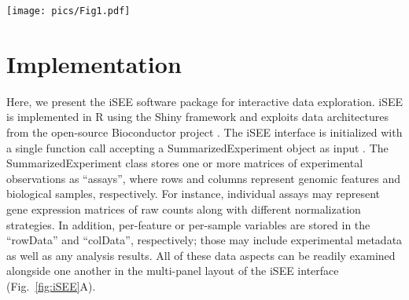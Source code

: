 \documentclass[10pt,a4paper,twocolumn]{article}
\begin{document}
\begin{figure*}[t]
\texttt{[image: pics/Fig1.pdf]}
\caption{iSEE uses a customisable multi-panel layout (A) that simultaneously displays one or more panels of various types, where each panel type visualizes a different aspect of the data.
New panels of any type can be added (i), and all panels can be removed, reordered or resized (ii).
Panel types are available to visualize sample-based reduced dimensionality embeddings (iii), sample-level metadata (iv), and experimental observations across samples for each feature (v).
For these panel types, each sample is represented as a point, which can be coloured according to sample-level metadata or feature-level observations.
Depending on whether the variables of interest are categorical or numeric, panels will automatically switch between scatter plots, violin plots or ``rectangle plots'' (where each combination of categorical levels is represented by a rectangle with area proportional to the frequency of combination).
Other panel types include row statistics tables (vi), to facilitate searching across features and their metadata; heatmaps (vii), to visualize experimental observations for multiple features; and feature-level metadata plots.
(B) Information can be transmitted between panels according to a user-specified scheme.
Here, the selection of feature $X$ in the row statistics table determines the y-axis of the feature expression plot, and colours the samples in the reduced dimension plot by the expression of $X$.
Selection of points in the reduced dimension plot (dotted blue line) also determines the samples that are shown in the column data (i.e., sample metadata) plot;
further selection of points in the column data plot determines the samples that are shown in the heatmap.
}
\label{fig:iSEE}
\end{figure*}

\section*{Implementation}
Here, we present the iSEE software package for interactive data exploration.
iSEE is implemented in R using the Shiny framework \citep{chang2017shiny} and exploits data architectures from the open-source Bioconductor project \citep{gentleman2004bioconductor}.
The iSEE interface is initialized with a single function call accepting a SummarizedExperiment object as input \citep{huber2015orchestrating}.
The SummarizedExperiment class stores one or more matrices of experimental observations as ``assays'', where rows and columns represent genomic features and biological samples, respectively.
For instance, individual assays may represent gene expression matrices of raw counts along with different normalization strategies.
In addition, per-feature or per-sample variables are stored in the ``rowData'' and ``colData'', respectively; those may include experimental metadata as well as any analysis results.
All of these data aspects can be readily examined alongside one another in the multi-panel layout of the iSEE interface (Fig.~\ref{fig:iSEE}A).
\end{document}
